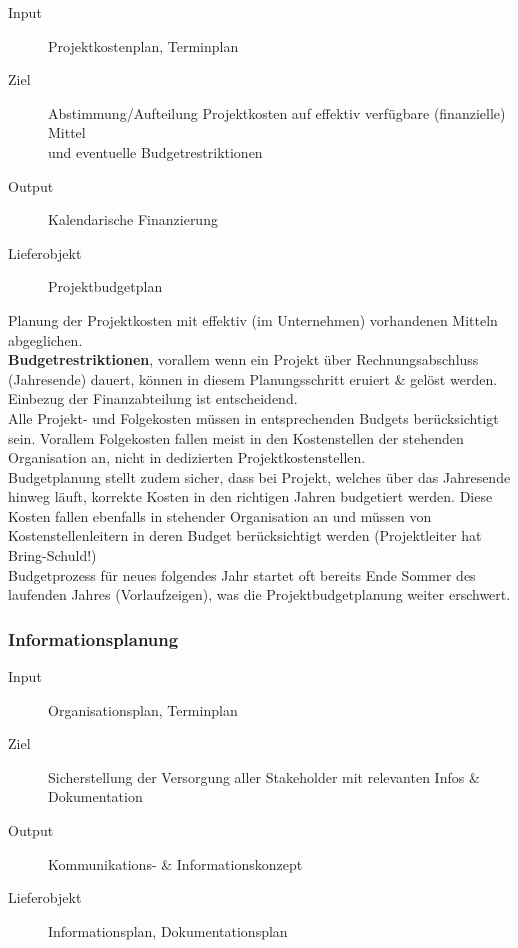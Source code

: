 \documentclass[a4paper]{article}
\begin{document}
		\begin{description}
			\item[Input] Projektkostenplan, Terminplan
			\item[Ziel] Abstimmung/Aufteilung Projektkosten auf effektiv verfügbare (finanzielle) Mittel\\
					und eventuelle Budgetrestriktionen
 			\item[Output] Kalendarische Finanzierung
			\item[Lieferobjekt] Projektbudgetplan
		\end{description}
		\vspace{1em}
		\noindent
		Planung der Projektkosten mit effektiv (im Unternehmen) vorhandenen Mitteln abgeglichen.\\
		\textbf{Budgetrestriktionen}, vorallem wenn ein Projekt über Rechnungsabschluss (Jahresende) dauert, können in diesem Planungsschritt eruiert \& gelöst werden.
		Einbezug der Finanzabteilung ist entscheidend.\\
		Alle Projekt- und Folgekosten müssen in entsprechenden Budgets berücksichtigt sein.
		Vorallem Folgekosten fallen meist in den Kostenstellen der stehenden Organisation an, nicht in dedizierten Projektkostenstellen.\\
		Budgetplanung stellt zudem sicher, dass bei Projekt, welches über das Jahresende hinweg läuft, korrekte Kosten in den richtigen Jahren budgetiert werden.
		Diese Kosten fallen ebenfalls in stehender Organisation an und müssen von Kostenstellenleitern in deren Budget berücksichtigt werden (Projektleiter hat Bring-Schuld!)\\
		Budgetprozess für neues folgendes Jahr startet oft bereits Ende Sommer des laufenden Jahres (Vorlaufzeigen), was die Projektbudgetplanung weiter erschwert.
		
\newpage
		
		\subsubsection{Informationsplanung}
		
		\begin{description}
			\item[Input] Organisationsplan, Terminplan
			\item[Ziel] Sicherstellung der Versorgung aller Stakeholder mit relevanten Infos \& Dokumentation
			\item[Output] Kommunikations- \& Informationskonzept
			\item[Lieferobjekt] Informationsplan, Dokumentationsplan
		\end{description}
	
\end{document}

